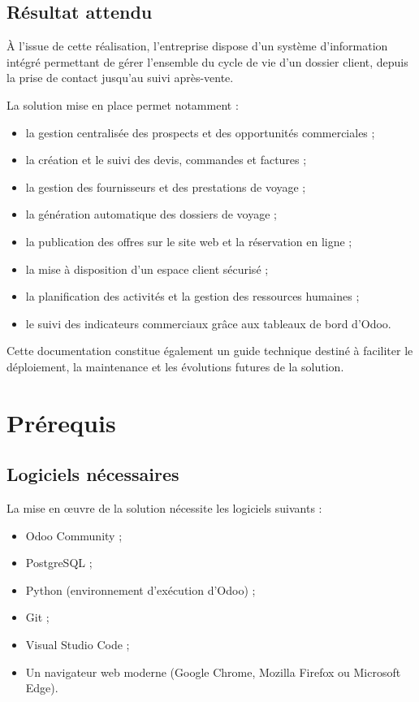 \documentclass[12pt,a4paper]{report}
\begin{document}
\section{Résultat attendu}

À l'issue de cette réalisation, l'entreprise dispose d'un système d'information intégré permettant de gérer l'ensemble du cycle de vie d'un dossier client, depuis la prise de contact jusqu'au suivi après-vente.

La solution mise en place permet notamment :

\begin{itemize}
    \item la gestion centralisée des prospects et des opportunités commerciales ;
    \item la création et le suivi des devis, commandes et factures ;
    \item la gestion des fournisseurs et des prestations de voyage ;
    \item la génération automatique des dossiers de voyage ;
    \item la publication des offres sur le site web et la réservation en ligne ;
    \item la mise à disposition d'un espace client sécurisé ;
    \item la planification des activités et la gestion des ressources humaines ;
    \item le suivi des indicateurs commerciaux grâce aux tableaux de bord d'Odoo.
\end{itemize}

Cette documentation constitue également un guide technique destiné à faciliter le déploiement, la maintenance et les évolutions futures de la solution.

\chapter{Prérequis}

\section{Logiciels nécessaires}

La mise en œuvre de la solution nécessite les logiciels suivants :

\begin{itemize}
    \item Odoo Community ;
    \item PostgreSQL ;
    \item Python (environnement d'exécution d'Odoo) ;
    \item Git ;
    \item Visual Studio Code ;
    \item Un navigateur web moderne (Google Chrome, Mozilla Firefox ou Microsoft Edge).
\end{itemize}
\end{document}

